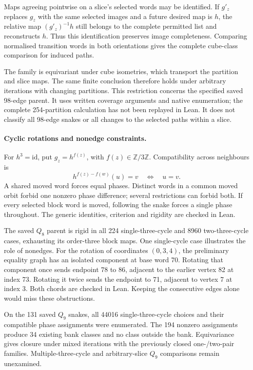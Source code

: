 \documentclass[11pt,a4paper]{article}
\theoremstyle{definition}
\theoremstyle{remark}
\begin{document}
Maps agreeing pointwise on a slice's selected words may be identified.
If $g'_z$ replaces $g_z$ with the same selected images and a future
desired map is $h$, the relative map $(g'_z)^{-1}h$ still belongs
to the complete permitted list and reconstructs $h$. Thus this
identification preserves image completeness. Comparing normalised
transition words in both orientations gives the complete cube-class
comparison for induced paths.

The family is equivariant under cube isometries, which transport the
partition and slice maps. The same finite conclusion therefore
holds under arbitrary iterations with changing partitions. This
restriction concerns the specified saved 98-edge parent. It uses
written coverage arguments and native enumeration; the complete
254-partition calculation has not been replayed in Lean. It does
not classify all 98-edge snakes or all changes to the selected
paths within a slice.

\paragraph{Cyclic rotations and nonedge constraints.}
For $h^3=\mathrm{id}$, put $g_z=h^{f(z)}$, with
$f(z)\in\mathbb Z/3\mathbb Z$. Compatibility across neighbours is
\[
h^{f(z)-f(w)}(u)=v\quad\Longleftrightarrow\quad u=v.
\]
A shared moved word forces equal phases. Distinct words in a common
moved orbit forbid one nonzero phase difference; several restrictions
can forbid both. If every selected block word is moved, following
the snake forces a single phase throughout. The generic identities,
criterion and rigidity are checked in Lean.

The saved $Q_8$ parent is rigid in all 224 single-three-cycle and
8960 two-three-cycle cases, exhausting its order-three block maps.
One single-cycle case illustrates the role of nonedges. For the
rotation of coordinates $(0,3,4)$, the preliminary equality graph
has an isolated component at base word 70. Rotating that component
once sends endpoint 78 to 86, adjacent to the earlier vertex 82 at
index 73. Rotating it twice sends the endpoint to 71, adjacent to
vertex 7 at index 3. Both chords are checked in Lean. Keeping the
consecutive edges alone would miss these obstructions.

On the 131 saved $Q_9$ snakes, all 44016 single-three-cycle choices
and their compatible phase assignments were enumerated. The 194
nonzero assignments produce 34 existing bank classes and no class
outside the bank. Equivariance gives closure under mixed iterations
with the previously closed one-/two-pair families. Multiple-three-cycle
and arbitrary-slice $Q_9$ comparisons remain unexamined.
\end{document}
